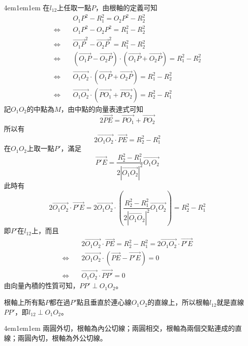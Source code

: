 \documentclass[12pt]{article}
\begin{document}
\begin{mybox}[證明]{4em}{1em}{1em}
    在$l_{12}$上任取一點$P$，由根軸的定義可知
    \begin{align*}
        &O_1P^2-R_1^2=O_2P^2-R_2^2\\
        \Leftrightarrow\quad&O_1P^2-O_2P^2=R_1^2-R_2^2\\
        \Leftrightarrow\quad&\overrightarrow{O_1P}^2-\overrightarrow{O_2P}^2=R_1^2-R_2^2\\
        \Leftrightarrow\quad&\left(\overrightarrow{O_1P}-\overrightarrow{O_2P}\right)\cdot\left(\overrightarrow{O_1P}+\overrightarrow{O_2P}\right)=R_1^2-R_2^2\\
        \Leftrightarrow\quad&\overrightarrow{O_1O_2}\cdot\left(\overrightarrow{O_1P}+\overrightarrow{O_2P}\right)=R_1^2-R_2^2\\
        \Leftrightarrow\quad&\overrightarrow{O_1O_2}\cdot\left(\overrightarrow{PO_1}+\overrightarrow{PO_2}\right)=R_2^2-R_1^2
    \end{align*}
    記$O_1O_2$的中點為$M$，由中點的向量表達式可知
    $$
        2\overrightarrow{PE}=\overrightarrow{PO_1}+\overrightarrow{PO_2}
    $$
    所以有
    $$
        2\overrightarrow{O_1O_2}\cdot\overrightarrow{PE}=R_2^2-R_1^2
    $$
    在$O_1O_2$上取一點$P'$，滿足
    $$
        \overrightarrow{P'E}=\frac{R_2^2-R_1^2}{2\left|\overrightarrow{O_1O_2}\right|^2}\overrightarrow{O_1O_2}
    $$
    此時有
    $$
        2\overrightarrow{O_1O_2}\cdot\overrightarrow{P'E}
        =2\overrightarrow{O_1O_2}\cdot\left(\frac{R_2^2-R_1^2}{2\left|\overrightarrow{O_1O_2}\right|^2}\overrightarrow{O_1O_2}\right)
        =R_2^2-R_1^2
    $$
    即$P'$在$l_{12}$上，而且
    \begin{align*}
        &2\overrightarrow{O_1O_2}\cdot\overrightarrow{PE}=R_2^2-R_1^2=2\overrightarrow{O_1O_2}\cdot\overrightarrow{P'E}\\
        \Leftrightarrow\quad&2\overrightarrow{O_1O_2}\cdot\left(\overrightarrow{PE}-\overrightarrow{P'E}\right)=0\\
        \Leftrightarrow\quad&\overrightarrow{O_1O_2}\cdot\overrightarrow{PP'}=0
    \end{align*}
    由向量內積的性質可知，$PP'\perp O_1O_2$。

    根軸上所有點$P$都在過$P'$點且垂直於連心線$O_1O_2$的直線上，所以根軸$l_{12}$就是直線$PP'$，即$l_{12}\perp O_1O_2$。
\end{mybox}
\begin{mybox}[定理2]{4em}{1em}{1em}
    兩圓外切，根軸為內公切線；兩圓相交，根軸為兩個交點連成的直線；兩圓內切，根軸為外公切線。
\end{mybox}
\end{document}
